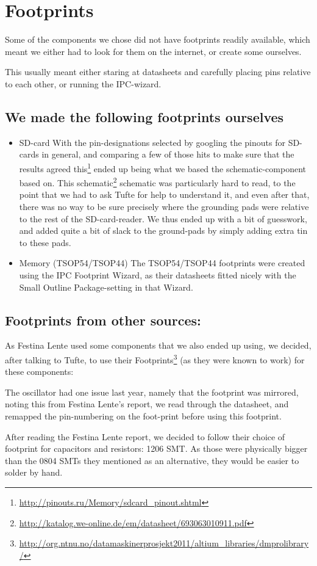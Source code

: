 \section {Footprints}
Some of the components we chose did not have footprints readily available, which
meant we either had to look for them on the internet, or create some ourselves.

This usually meant either staring at datasheets and carefully placing pins
relative to each other, or running the IPC-wizard.

\subsection {We made the following footprints ourselves}

\begin {itemize}
\item SD-card 
  With the pin-designations selected by googling the pinouts for SD-cards in
  general, and comparing a few of those hits to make sure that the results
  agreed this\footnote{\url{http://pinouts.ru/Memory/sdcard_pinout.shtml}} 
  ended up being what we based the schematic-component based on. This 
  schematic\footnote{\url{http://katalog.we-online.de/em/datasheet/693063010911.pdf}}
  schematic was particularly hard to read, to the point that we had to ask 
  Tufte for help to understand it, and even after that, there was no way to
  be sure precisely where the grounding pads were relative to the rest of the 
  SD-card-reader. We thus ended up with a bit of guesswork, and added quite a 
  bit of slack to the ground-pads by simply adding extra tin to these pads.
\item Memory (TSOP54/TSOP44)
The TSOP54/TSOP44 footprints were created using the IPC Footprint Wizard, as
their datasheets fitted nicely with the Small Outline Package-setting in that
Wizard.
\end {itemize}

\subsection{Footprints from other sources:}
As Festina Lente used some components that we also ended up using, we decided,
after talking to Tufte, to use their Footprints\footnote{\url{http://org.ntnu.no/datamaskinerprosjekt2011/altium_libraries/dmprolibrary/}}
(as they were known to work) for these components:


The oscillator had one issue last year, namely that the
footprint was mirrored, noting this from Festina Lente's report, we read
through the datasheet, and remapped the pin-numbering on the foot-print 
before using this footprint.

After reading the Festina Lente report\cite{berg2011festinalente}, we decided to
follow their choice of footprint for capacitors and resistors: 1206 SMT. As
those were physically bigger than the 0804 SMTs they mentioned as an
alternative, they would be easier to solder by hand.
